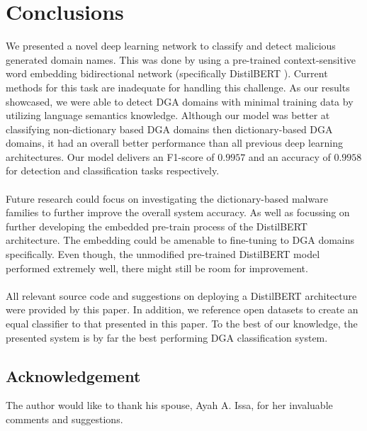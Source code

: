 \chapter{Conclusions}\label{conclusions}
We presented a novel deep learning network to classify and detect malicious generated domain names. This was done by using a pre-trained context-sensitive word embedding bidirectional network (specifically DistilBERT \cite{Sanh2019DistilBERTAD}). Current methods for this task are inadequate for handling this challenge. As our results showcased, we were able to detect DGA domains with minimal training data by utilizing language semantics knowledge. Although our model was better at classifying non-dictionary based DGA domains then dictionary-based DGA domains, it had an overall better performance than all previous deep learning architectures. Our model delivers an F1-score of $0.9957$ and an accuracy of $0.9958$ for detection and classification tasks respectively.\\\\
Future research could focus on investigating the dictionary-based malware families to further improve the overall system accuracy. As well as focussing on further developing the embedded pre-train process of the DistilBERT architecture. The embedding could be amenable to fine-tuning to DGA domains specifically. Even though, the unmodified pre-trained DistilBERT model performed extremely well, there might still be room for improvement.\\\\ 
All relevant source code and suggestions on deploying a DistilBERT architecture were provided by this paper. In addition, we reference open datasets to create an equal classifier to that presented in this paper. To the best of our knowledge, the presented system is by far the best performing DGA classification system. 


\section{Acknowledgement}
The author would like to thank his spouse, Ayah A. Issa, for her invaluable comments and suggestions.